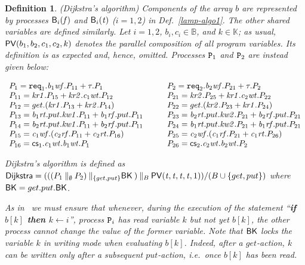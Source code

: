 \documentclass[copyright,creativecommons]{eptcs}
\newtheorem{definition}[theorem]{Definition}
\newcommand{\bool}{{\mathbb B}}
\newcommand{\kvalues}{{\mathbb K}}
\newcommand{\fa}{\mathit{f}}
\newcommand{\tr}{\mathit{t}}
\newcommand{\Bv}{{\sf B}}
\newcommand{\rtb}[1]{{\it b_{{\rm #1}}rt}}
\newcommand{\rfb}[1]{{\it b_{{\rm #1}}rf}}
\newcommand{\wtb}[1]{{\it b_{{\rm #1}}wt}}
\newcommand{\wfb}[1]{{\it b_{{\rm #1}}wf}}
\newcommand{\wtc}[1]{{\it c_{{\rm #1}}wt}}
\newcommand{\wfc}[1]{{\it c_{{\rm #1}}wf}}
\newcommand{\rtc}[1]{{\it c_{{\rm #1}}rt}}
\newcommand{\rfc}[1]{{\it c_{{\rm #1}}rf}}
\newcommand{\rk}[1]{{\it kr #1}}
\newcommand{\wk}[1]{{\it kw #1}}
\newcommand{\vp}{{\sf PV}}
\newcommand{\req}{{\tt req}}
\newcommand{\cs}{{\sf cs}}
\newcommand{\dijkstra}{{\it Dijkstra}}
\newcommand{\BK}{{\sf BK}}
\newcommand{\dijkstraa}{{\sf Dijkstra}} \newcommand{\dijkstrab}{\dijkstra}
\newcommand{\proc}{{\tt P}}
\begin{document}
\begin{definition}\rm\label{def:dijkstra1} ({\it Dijkstra's algorithm}) 
Components of the array $b$ are represented by processes $\Bv_i(\fa)$
and $\Bv_i(\tr)$ ($i=1,2$) in Def.~\ref{lamp-algo1}. The other shared
variables are defined similarly.
Let $i=1,2$, $b_i, c_i \in \bool$, and $k \in \kvalues$; as usual, 
$\vp(b_1, b_2, c_1, c_2, k)$ denotes the parallel composition of all
program variables. Its definition is as expected and, hence, omitted.
Processes $\proc_1$ and $\proc_2$ are instead given below:

\hspace{1cm}
$\begin{array}{l l}
P_{1} = \req_1.\wfb{1}.P_{11}  + \tau.P_1 & 
P_{2} = \req_2.\wfb{2}.P_{21} + \tau.P_2 \\
P_{11} = \rk{1}.P_{15} + \rk{2}.\wtc{1}.P_{12} & 
P_{21} = \rk{2}.P_{25} + \rk{1}.\wtc{2}.P_{22} \\
P_{12} = get.(\rk{1}.P_{13} + \rk{2}.P_{14}) &
P_{22} = get.(\rk{2}.P_{23} + \rk{1}.P_{24})\\
P_{13} = \rtb{1}.put.\wk{1}.P_{11} + \rfb{1}.put.P_{11}\qquad &
P_{23} = \rtb{2}.put.\wk{2}.P_{21} + \rfb{2}.put.P_{21}\\
P_{14} = \rtb{2}.put.\wk{1}.P_{11} + \rfb{2}.put.P_{11} &
P_{24} = \rtb{1}.put.\wk{2}.P_{21} + \rfb{1}.put.P_{21}\\
P_{15}= \wfc{1}.(\rfc{2}.P_{11} + \rtc{2}.P_{16}) &
P_{25}= \wfc{2}.(\rfc{1}.P_{21} + \rtc{1}.P_{26}) \\
P_{16}= \cs_1.\wtc{1}.\wtb{1}.P_1 &
P_{26}= \cs_2.\wtc{2}.\wtb{2}.P_2 
\end{array}$

\vspace{0.1cm}

\noindent Dijkstra's algorithm is defined as $\dijkstraa =
(((P_1 \:\|_\emptyset\: P_2) \:\|_{\{get, put\}} \BK\: ) \:\|_B\: \vp(\tr,
\tr, \tr, \tr, 1))/(B \cup \{get,put\})$ where $\BK= get.put.\BK$.

As in~\cite{Walker89} we must ensure that whenever, during the execution of
the statement ``{\bf if $b[k]$ then $k \leftarrow i$}'', process $\proc_i$
has read variable $k$ but not yet $b[k]$, the other process cannot change
the value of the former variable. Note that $\BK$ locks the variable $k$ in
writing mode when evaluating $b[k]$. Indeed, after a $get$-action, $k$ can
be written only after a subsequent $put$-action, i.e.\ once $b[k]$ has been
read.
\end{definition}
\end{document}

